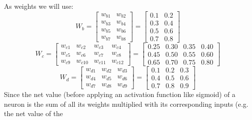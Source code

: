 \documentclass[11pt, halfparskip]{article}
\begin{document}
        \newpage
        As weights we will use:
        \[
        	 W_b =
            \begin{bmatrix}
            	w_{b1} & w_{b2}\\
            	w_{b3} & w_{b4}\\
            	w_{b5} & w_{b6}\\
            	w_{b7} & w_{b8}
            \end{bmatrix}
            =
            \begin{bmatrix}
            	0.1 & 0.2\\
            	0.3 & 0.4\\
            	0.5 & 0.6\\
            	0.7 & 0.8
            \end{bmatrix}
        \]
        \[
            W_c =
            \begin{bmatrix}
            	w_{c1} & w_{c2} & w_{c3} & w_{c4}\\
            	w_{c5} & w_{c6} & w_{c7} & w_{c8}\\
            	w_{c9} & w_{c10} & w_{c11} & w_{c12}
            \end{bmatrix}
            =
            \begin{bmatrix}
            	0.25 & 0.30 & 0.35 & 0.40\\
            	0.45 & 0.50 & 0.55 & 0.60\\
            	0.65 & 0.70 & 0.75 & 0.80
            \end{bmatrix}
        \]
        \[
            W_d =
            \begin{bmatrix}
            	w_{d1} & w_{d2} & w_{d3}\\
            	w_{d4} & w_{d5} & w_{d6}\\
            	w_{d7} & w_{d8} & w_{d9}
            \end{bmatrix}
            =
            \begin{bmatrix}
            	0.1 & 0.2 & 0.3\\
            	0.4 & 0.5 & 0.6\\
            	0.7 & 0.8 & 0.9
            \end{bmatrix}
        \]
        Since the net value (before applying an activation function like sigmoid) of a neuron is the sum of all its weights multiplied with its corresponding inputs (e.g. the net value of the
\end{document}
